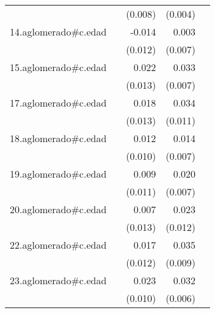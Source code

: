 {\begin{longtable}{l*{4}{D{.}{.}{-1}}}
            &                     &     (0.008)         &     (0.004)         &                     \\
\addlinespace
14.aglomerado#c.edad&                     &      -0.014         &       0.003         &                     \\
            &                     &     (0.012)         &     (0.007)         &                     \\
\addlinespace
15.aglomerado#c.edad&                     &       0.022         &       0.033\sym{***}&                     \\
            &                     &     (0.013)         &     (0.007)         &                     \\
\addlinespace
17.aglomerado#c.edad&                     &       0.018         &       0.034\sym{**} &                     \\
            &                     &     (0.013)         &     (0.011)         &                     \\
\addlinespace
18.aglomerado#c.edad&                     &       0.012         &       0.014\sym{*}  &                     \\
            &                     &     (0.010)         &     (0.007)         &                     \\
\addlinespace
19.aglomerado#c.edad&                     &       0.009         &       0.020\sym{**} &                     \\
            &                     &     (0.011)         &     (0.007)         &                     \\
\addlinespace
20.aglomerado#c.edad&                     &       0.007         &       0.023\sym{*}  &                     \\
            &                     &     (0.013)         &     (0.012)         &                     \\
\addlinespace
22.aglomerado#c.edad&                     &       0.017         &       0.035\sym{***}&                     \\
            &                     &     (0.012)         &     (0.009)         &                     \\
\addlinespace
23.aglomerado#c.edad&                     &       0.023\sym{*}  &       0.032\sym{***}&                     \\
            &                     &     (0.010)         &     (0.006)         &                     \\

\end{longtable}}
